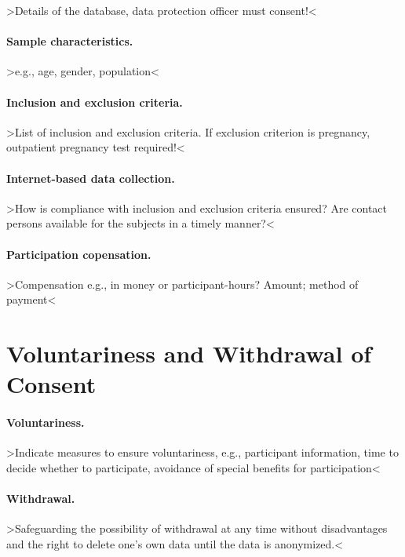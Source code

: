 \documentclass[11pt,twoside,a4paper]{article}
\begin{document}
>Details of the database, data protection officer must consent!<

\paragraph{Sample characteristics.}

>e.g., age, gender, population<

\paragraph{Inclusion and exclusion criteria.}

>List of inclusion and exclusion criteria. If exclusion criterion is pregnancy, outpatient pregnancy test required!<

\paragraph{Internet-based data collection.}

>How is compliance with inclusion and exclusion criteria ensured? Are contact persons available for the subjects in a timely manner?<

\paragraph{Participation copensation.}

>Compensation e.g., in money or participant-hours? Amount; method of payment<

\section{Voluntariness and Withdrawal of Consent}

\paragraph{Voluntariness.}

>Indicate measures to ensure voluntariness, e.g., participant information, time to decide whether to participate, avoidance of special benefits for participation<

\paragraph{Withdrawal.}

>Safeguarding the possibility of withdrawal at any time without disadvantages and the right to delete one's own data until the data is anonymized.<
\end{document}
